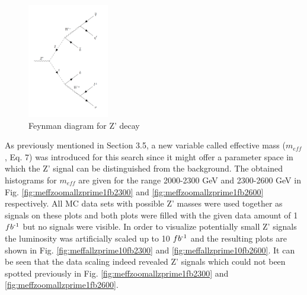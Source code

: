 \documentclass[runningheads,a4paper]{llncs}
\newcommand{\invfb}{fb\textsuperscript{-1}}
\begin{document}
\begin{figure}[H]
\centering
\includegraphics[height=5cm]{feynm_ZPrime}
\caption{Feynman diagram for Z' decay}
\label{fig:feynmzprime}
\end{figure}

As previously mentioned in Section 3.5, a new variable called effective mass (${m}_{eff}$, Eq. 7) was introduced for this search since it might offer a parameter space in which the Z' signal can be distinguished from the background. The obtained histograms for ${ m }_{ eff }$ are given for the range 2000-2300 GeV and 2300-2600 GeV in Fig. \ref{fig:meffzoomallzprime1fb2300} and \ref{fig:meffzoomallzprime1fb2600} respectively. All MC data sets with possible Z' masses were used together as signals on these plots and both plots were filled with the given data amount of 1 $\invfb$ but no signals were visible. In order to visualize potentially small Z' signals the luminosity was artificially scaled up to 10 $\invfb$ and the resulting plots are shown in Fig. \ref{fig:meffallzprime10fb2300} and \ref{fig:meffallzprime10fb2600}. It can be seen that the data scaling indeed revealed Z' signals which could not been spotted previously in Fig. \ref{fig:meffzoomallzprime1fb2300} and \ref{fig:meffzoomallzprime1fb2600}.\\
\end{document}
